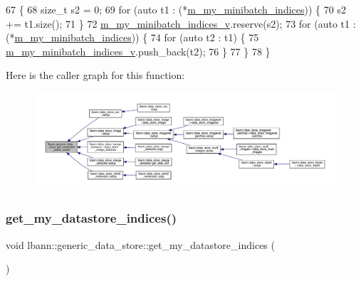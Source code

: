 \begin{DoxyCode}
67                                                     \{
68   \textcolor{keywordtype}{size\_t} s2 = 0;
69   \textcolor{keywordflow}{for} (\textcolor{keyword}{auto} t1 : (*\hyperlink{classlbann_1_1generic__data__store_a54c0a85cd536ef566604c4e9916910c8}{m\_my\_minibatch\_indices})) \{
70     s2 += t1.size();
71   \}
72   \hyperlink{classlbann_1_1generic__data__store_a41f7fec1f1f3d6568a5765be7a6784eb}{m\_my\_minibatch\_indices\_v}.reserve(s2);
73   \textcolor{keywordflow}{for} (\textcolor{keyword}{auto} t1 : (*\hyperlink{classlbann_1_1generic__data__store_a54c0a85cd536ef566604c4e9916910c8}{m\_my\_minibatch\_indices})) \{
74     \textcolor{keywordflow}{for} (\textcolor{keyword}{auto} t2 : t1) \{
75       \hyperlink{classlbann_1_1generic__data__store_a41f7fec1f1f3d6568a5765be7a6784eb}{m\_my\_minibatch\_indices\_v}.push\_back(t2);
76     \}
77   \}
78 \}
\end{DoxyCode}
Here is the caller graph for this function\+:\nopagebreak
\begin{figure}[H]
\begin{center}
\leavevmode
\includegraphics[width=350pt]{classlbann_1_1generic__data__store_ab861db5f81e45a6063b8922a331dd007_icgraph}
\end{center}
\end{figure}
\mbox{\label{classlbann_1_1generic__data__store_a3558f87939755b08ae151623a5799127}} 
\subsubsection{\texorpdfstring{get\+\_\+my\+\_\+datastore\+\_\+indices()}{get\_my\_datastore\_indices()}}
{\footnotesize\ttfamily void lbann\+::generic\+\_\+data\+\_\+store\+::get\+\_\+my\+\_\+datastore\+\_\+indices (\begin{DoxyParamCaption}{ }\end{DoxyParamCaption})\hspace{0.3cm}{\ttfamily [protected]}}



